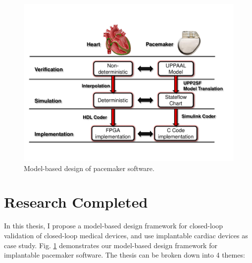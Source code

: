 \documentclass[a4paper]{article}
\begin{document}



\newpage
\begin{figure}[t]
	\centering
	\includegraphics[scale=0.45]{figs/model_based_b.pdf}
	\caption{\small Model-based design of pacemaker software.}
	\label{fig:MBD}
\end{figure}
\section{Research Completed}
In this thesis, I propose a model-based design framework for closed-loop validation of closed-loop medical devices, and use implantable cardiac devices as case study.
Fig. \ref{fig:MBD} demonstrates our model-based design framework for implantable pacemaker software.
The thesis can be broken down into 4 themes:
\end{document}
